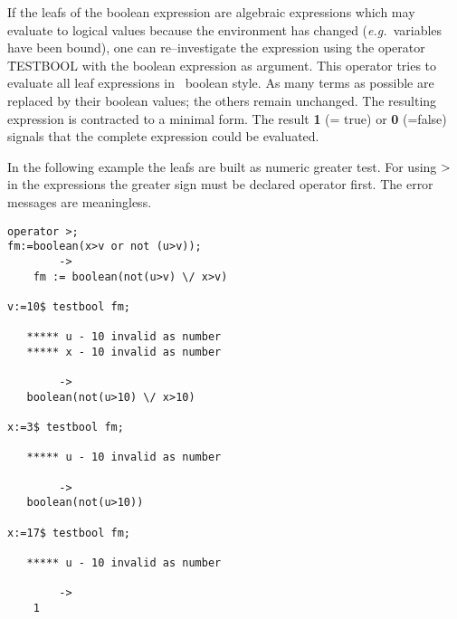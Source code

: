If the leafs of the boolean expression are algebraic expressions which
may evaluate to logical values because the environment has changed
({\em e.g.\ }variables have been bound), one can re--investigate the
expression using the operator \f{TESTBOOL} with the
boolean expression as argument.  This operator tries to evaluate all
leaf expressions in \REDUCE\ boolean style.  As many terms as possible
are replaced by their boolean values; the others remain unchanged.
The resulting expression is contracted to a minimal form.  The result
{\bf 1} (= true) or {\bf 0} (=false) signals that the complete
expression could be evaluated.

In the following example the leafs are built as numeric greater test.
For using ${\bf >}$ in the expressions the greater sign must
be declared operator first.  The error messages are meaningless.
\begin{verbatim}
operator >;
fm:=boolean(x>v or not (u>v));
        ->
    fm := boolean(not(u>v) \/ x>v)

v:=10$ testbool fm;

   ***** u - 10 invalid as number
   ***** x - 10 invalid as number

        ->
   boolean(not(u>10) \/ x>10)

x:=3$ testbool fm;

   ***** u - 10 invalid as number

        ->
   boolean(not(u>10))

x:=17$ testbool fm;

   ***** u - 10 invalid as number

        ->
    1
\end{verbatim}

